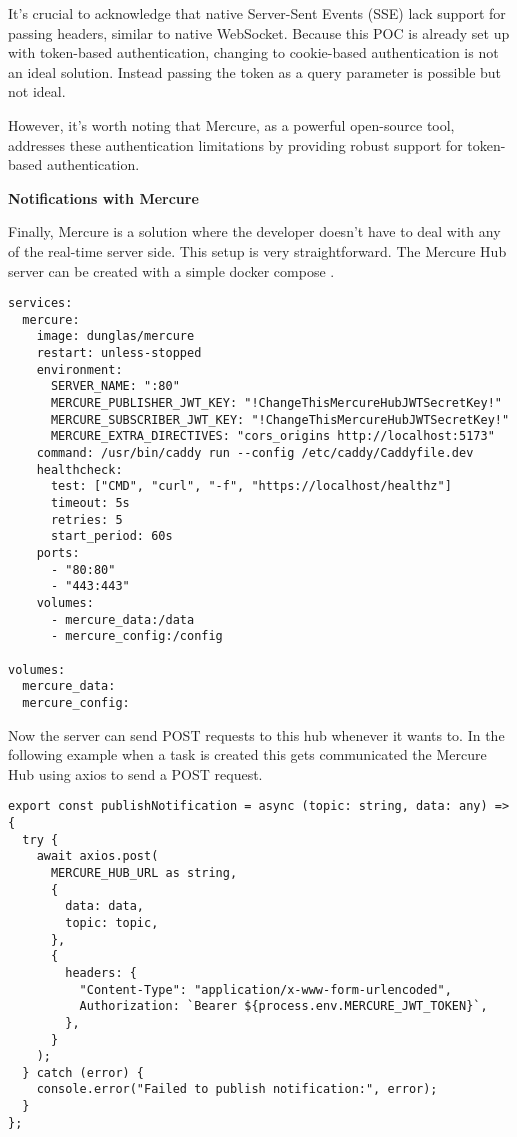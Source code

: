 It's crucial to acknowledge that native Server-Sent Events (SSE) lack support for passing headers, similar to native WebSocket. Because this POC is already set up with token-based authentication, changing to cookie-based authentication is not an ideal solution. Instead passing the token as a query parameter is possible but not ideal.

However, it's worth noting that Mercure, as a powerful open-source tool, addresses these authentication limitations by providing robust support for token-based authentication. 

\textbf{Notifications with Mercure}

Finally, Mercure is a solution where the developer doesn't have to deal with any of the real-time server side. This setup is very straightforward. The Mercure Hub server can be created with a simple docker compose \cite{mercure}. 

\begin{lstlisting}[caption=docker-compose.yaml for Mercure Hub]
services:
  mercure:
    image: dunglas/mercure
    restart: unless-stopped
    environment:
      SERVER_NAME: ":80"
      MERCURE_PUBLISHER_JWT_KEY: "!ChangeThisMercureHubJWTSecretKey!"
      MERCURE_SUBSCRIBER_JWT_KEY: "!ChangeThisMercureHubJWTSecretKey!"
      MERCURE_EXTRA_DIRECTIVES: "cors_origins http://localhost:5173"
    command: /usr/bin/caddy run --config /etc/caddy/Caddyfile.dev
    healthcheck:
      test: ["CMD", "curl", "-f", "https://localhost/healthz"]
      timeout: 5s
      retries: 5
      start_period: 60s
    ports:
      - "80:80"
      - "443:443"
    volumes:
      - mercure_data:/data
      - mercure_config:/config

volumes:
  mercure_data:
  mercure_config:
\end{lstlisting}

Now the server can send POST requests to this hub whenever it wants to. In the following example when a task is created this gets communicated the Mercure Hub using axios to send a POST request.

\begin{lstlisting}[caption=POST request to the Mercure Hub]
export const publishNotification = async (topic: string, data: any) => {
  try {
    await axios.post(
      MERCURE_HUB_URL as string,
      {
        data: data,
        topic: topic,
      },
      {
        headers: {
          "Content-Type": "application/x-www-form-urlencoded",
          Authorization: `Bearer ${process.env.MERCURE_JWT_TOKEN}`,
        },
      }
    );
  } catch (error) {
    console.error("Failed to publish notification:", error);
  }
};
\end{lstlisting}

